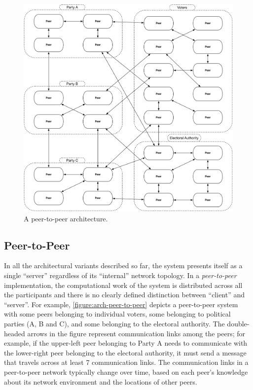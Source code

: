 \begin{figure}[t!]
\begin{center}
\includegraphics[width=6.5in]{architecture_resources/peer-to-peer.pdf}
\end{center}
\caption{A peer-to-peer architecture.}
\label{figure:arch-peer-to-peer}
\end{figure}

\subsection{Peer-to-Peer}

In all the architectural variants described so far, the system
presents itself as a single ``server'' regardless of its ``internal''
network topology. In a \emph{peer-to-peer} implementation, the
computational work of the system is distributed across all the
participants and there is no clearly defined distinction between
``client'' and ``server''. For example,
\autoref{figure:arch-peer-to-peer} depicts a peer-to-peer system with
some peers belonging to individual voters, some belonging to
political parties (A, B and C), and some belonging to the electoral
authority. The double-headed arrows in the figure represent
communication links among the peers; for example, if the upper-left
peer belonging to Party A needs to communicate with the lower-right
peer belonging to the electoral authority, it must send a message that
travels across at least 7 communication links. The communication links
in a peer-to-peer network typically change over time, based on each
peer's knowledge about its network environment and the locations of
other peers.


